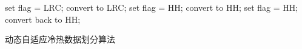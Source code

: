 \begin{algorithm}[htpb]
	\begin{algorithmic}[1]
		\setlength{\commentindent}{.3\textwidth}
		\setlength{\algorithmicindent}{1.5em}
		\renewcommand{\algorithmiccomment}[1]{\unskip\hfill\makebox[\commentindent][l]{$\rhd$~#1}\par}
		\LetLtxMacro{\oldalgorithmic}{\algorithmic}
		\renewcommand{\algorithmic}[1][0]{
			\oldalgorithmic[#1]
			\renewcommand{\ALC@com}[1]{
				\IFnum\pdfstrcmp{##1}{default}=0\ELSE\algorithmiccomment{##1}\fi}%
		}
        \STATE set flag = LRC;
        \STATE convert to LRC;
        \ENDIF
        \ENDFOR
        \STATE set flag = HH;
        \STATE convert to HH;
        \ENDIF
        \ENDFOR
        \STATE set flag = HH;
        \STATE convert back to HH;
        \ENDIF
        \ENDFOR
	\end{algorithmic}
	\caption{动态自适应冷热数据划分算法}
	\label{alg:4-1}
\end{algorithm}